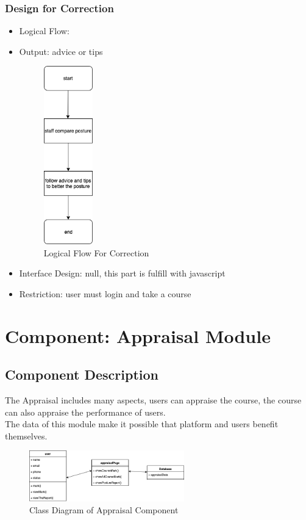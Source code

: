 \documentclass[16pt]{scrreprt}
\begin{document}
\subsubsection{Design for Correction}
\begin{itemize}
    \item Logical Flow:
    \item Output: advice or tips
        \begin{figure}[H]
            \centering
            \includegraphics[width=0.2\textwidth]{diagrams/flow-corrcetion.png}
            \caption{Logical Flow For Correction}
        \end{figure}
    \item Interface Design: null, this part is fulfill with javascript
    \item Restriction: user must login and take a course
\end{itemize}

\section{Component: Appraisal Module}
\subsection{Component Description}
The Appraisal includes many aspects, users can appraise the course, the course can also appraise the performance of users.\\
The data of this module make it possible that platform and users benefit themselves.

\begin{figure}[H]
    \centering
    \includegraphics[width=0.6\textwidth]{diagrams/class-appraisal.png}
    \caption{Class Diagram of Appraisal Component}
\end{figure}
\end{document}
